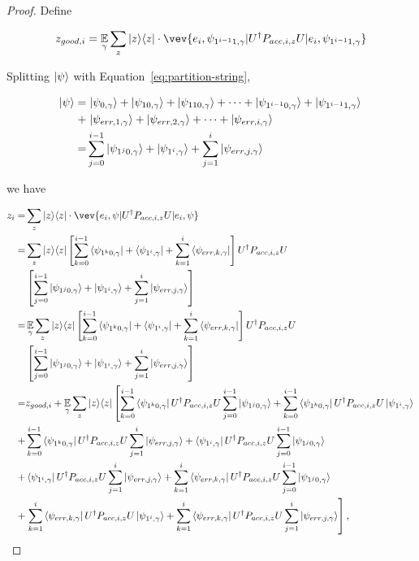 \begin{proof}
Define

\begin{align}
    z_{good,i}=\E_\gamma \sum_z \proj{z} \cdot \vev{e_i,\psi_{1^{i-1}1,\gamma}|U^\dag P_{acc,i,z} U|e_i,\psi_{1^{i-1}1,\gamma}}
\end{align}

Splitting $\ket{\psi}$ with Equation~\ref{eq:partition-string},

\begin{align}
    \ket{\psi}=& \left. \ket{\psi_{0,\gamma}}+\ket{\psi_{10,\gamma}}+\ket{\psi_{110,\gamma}}+\cdots+\ket{\psi_{1^{i-1}0,\gamma}}+
    \ket{\psi_{1^{i-1}1,\gamma}} \right. \nonumber \\
     +& \left.\ket{\psi_{err,1,\gamma}}+\ket{\psi_{err,2,\gamma}}+\cdots+\ket{\psi_{err,i,\gamma}}\right. \nonumber \\
     =& \sum_{j=0}^{i-1} \ket{\psi_{1^j0,\gamma}} +\ket{\psi_{1^i,\gamma}} +\sum_{j=1}^{i}\ket{\psi_{err,j,\gamma}}
\end{align}


we have

\begin{align}
    z_i =& \sum_z \proj{z} \cdot \vev{e_i,\psi|U^\dag P_{acc,i,z} U|e_i,\psi} \nn \\
    =& \sum_z \proj{z} \L[\sum_{k=0}^{i-1} \bra{\psi_{1^k0,\gamma}} +\bra{\psi_{1^i,\gamma}} +\sum_{k=1}^{i}\bra{\psi_{err,k,\gamma}} \R]U^\dag  P_{acc,i,z} U\nn \\
    &\L[ \sum_{j=0}^{i-1} \ket{\psi_{1^j0,\gamma}} +\ket{\psi_{1^i,\gamma}} +\sum_{j=1}^{i}\ket{\psi_{err,j,\gamma}}\R]  \nn \\
    =& \E_\gamma \sum_z \proj{z} \L[\sum_{k=0}^{i-1} \bra{\psi_{1^k0,\gamma}} +\bra{\psi_{1^i,\gamma}} +\sum_{k=1}^{i}\bra{\psi_{err,k,\gamma}} \R]U^\dag  P_{acc,i,z} U\nn \\
    &\L[ \sum_{j=0}^{i-1} \ket{\psi_{1^j0,\gamma}} +\ket{\psi_{1^i,\gamma}} +\sum_{j=1}^{i}\ket{\psi_{err,j,\gamma}}\R]  \nn \\
    =& z_{good,i}+ \E_\gamma \sum_z \proj{z} \L[\sum_{k=0}^{i-1} \bra{\psi_{1^k0,\gamma}}U^\dag  P_{acc,i,z}U   \sum_{j=0}^{i-1} \ket{\psi_{1^j0,\gamma}}+
    \sum_{k=0}^{i-1} \bra{\psi_{1^k0,\gamma}}U^\dag  P_{acc,i,z}U \ket{\psi_{1^i,\gamma}}  \R. \nn \\
      +&  \sum_{k=0}^{i-1} \bra{\psi_{1^k0,\gamma}}U^\dag  P_{acc,i,z}U\sum_{j=1}^{i}\ket{\psi_{err,j,\gamma}}
    +\bra{\psi_{1^i,\gamma}} U^\dag  P_{acc,i,z}U \sum_{j=0}^{i-1} \ket{\psi_{1^j0,\gamma}}
    \nn \\
    +&  \bra{\psi_{1^i,\gamma}} U^\dag  P_{acc,i,z}U \sum_{j=1}^{i}\ket{\psi_{err,j,\gamma}}
    +\sum_{k=1}^{i}\bra{\psi_{err,k,\gamma}} U^\dag  P_{acc,i,z}U  \sum_{j=0}^{i-1} \ket{\psi_{1^j0,\gamma}}
   \nn \\
    +&\L.   \sum_{k=1}^{i}\bra{\psi_{err,k,\gamma}} U^\dag  P_{acc,i,z}U \ket{\psi_{1^i,\gamma}} +\sum_{k=1}^{i}\bra{\psi_{err,k,\gamma}} U^\dag  P_{acc,i,z}U \sum_{j=1}^{i}\ket{\psi_{err,j,\gamma}} \R] , \nn     
\end{align}


\end{proof}
